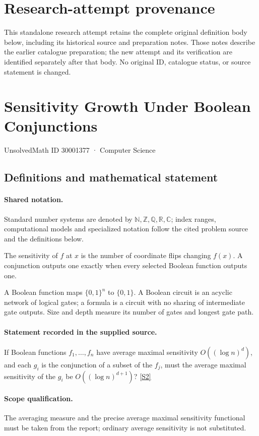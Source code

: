 \documentclass[11pt]{article}
\begin{document}
\section*{Research-attempt provenance}
This standalone research attempt retains the complete original definition body below,
including its historical source and preparation notes. Those notes describe the
earlier catalogue preparation; the new attempt and its verification are identified
separately after that body. No original ID, catalogue status, or source statement is changed.

\section{Sensitivity Growth Under Boolean Conjunctions}\label{30001377}
{\small UnsolvedMath ID 30001377 · Computer Science}
\subsection{Definitions and mathematical statement}

\paragraph{Shared notation.}Standard number systems are denoted by $\mathbb N,\mathbb Z,\mathbb Q,\mathbb R,\mathbb C$; index ranges, computational models and specialized notation follow the cited problem source and the definitions below.


The sensitivity of $f$ at $x$ is the number of coordinate flips changing $f(x)$. A conjunction outputs one exactly when every selected Boolean function outputs one.

A Boolean function maps $\{0,1\}^n$ to $\{0,1\}$. A Boolean circuit is an acyclic network of logical gates; a formula is a circuit with no sharing of intermediate gate outputs. Size and depth measure its number of gates and longest gate path.
\paragraph{Statement recorded in the supplied source.}
If Boolean functions $f_1,\ldots,f_n$ have average maximal sensitivity $O((\log n)^d)$, and each $g_i$ is the conjunction of a subset of the $f_j$, must the average maximal sensitivity of the $g_i$ be $O((\log n)^{d+1})$? \href{https://doi.org/10.4171/owr/2009/52}{[S2]}
\paragraph{Scope qualification.}
The averaging measure and the precise average maximal sensitivity functional must be taken from the report; ordinary average sensitivity is not substituted.
\end{document}
